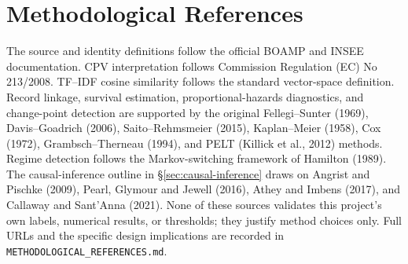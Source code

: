 \documentclass[11pt,a4paper]{article}
\newcommand{\pathcode}[1]{\texttt{\small #1}}
\begin{document}
\section{Methodological References}
The source and identity definitions follow the official BOAMP and INSEE
documentation. CPV interpretation follows Commission Regulation (EC) No
213/2008. TF--IDF cosine similarity follows the standard vector-space
definition. Record linkage, survival estimation, proportional-hazards
diagnostics, and change-point detection are supported by the original
Fellegi--Sunter (1969), Davis--Goadrich (2006), Saito--Rehmsmeier (2015),
Kaplan--Meier (1958), Cox (1972), Grambsch--Therneau (1994), and PELT
(Killick et al., 2012) methods. Regime detection follows the Markov-switching
framework of Hamilton (1989). The causal-inference outline in
\S\ref{sec:causal-inference} draws on Angrist and Pischke (2009), Pearl, Glymour
and Jewell (2016), Athey and Imbens (2017), and Callaway and Sant'Anna (2021).
None of these sources validates this project's own labels, numerical results,
or thresholds; they justify method choices only. Full URLs and the specific
design implications are recorded in \pathcode{METHODOLOGICAL\_REFERENCES.md}.
\end{document}
